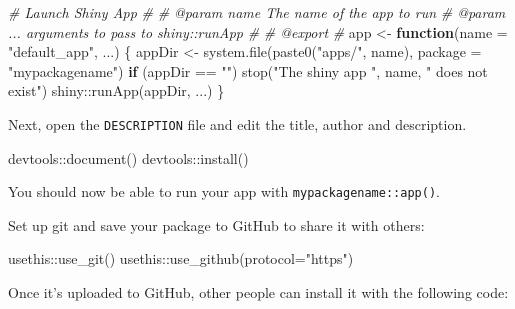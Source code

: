 \documentclass[
]{book}
\newenvironment{Shaded}{\begin{snugshade}}{\end{snugshade}}
\newcommand{\AttributeTok}[1]{\textcolor[rgb]{0.77,0.63,0.00}{#1}}
\newcommand{\CommentTok}[1]{\textcolor[rgb]{0.56,0.35,0.01}{\textit{#1}}}
\newcommand{\ControlFlowTok}[1]{\textcolor[rgb]{0.13,0.29,0.53}{\textbf{#1}}}
\newcommand{\FunctionTok}[1]{\textcolor[rgb]{0.00,0.00,0.00}{#1}}
\newcommand{\NormalTok}[1]{#1}
\newcommand{\OtherTok}[1]{\textcolor[rgb]{0.56,0.35,0.01}{#1}}
\newcommand{\SpecialCharTok}[1]{\textcolor[rgb]{0.00,0.00,0.00}{#1}}
\newcommand{\StringTok}[1]{\textcolor[rgb]{0.31,0.60,0.02}{#1}}
\begin{document}
\begin{Shaded}
\begin{Highlighting}[]
\CommentTok{\#\textquotesingle{} Launch Shiny App}
\CommentTok{\#\textquotesingle{}}
\CommentTok{\#\textquotesingle{} @param name The name of the app to run}
\CommentTok{\#\textquotesingle{} @param ... arguments to pass to shiny::runApp}
\CommentTok{\#\textquotesingle{}}
\CommentTok{\#\textquotesingle{} @export}
\CommentTok{\#\textquotesingle{}}
\NormalTok{app }\OtherTok{\textless{}{-}} \ControlFlowTok{function}\NormalTok{(}\AttributeTok{name =} \StringTok{"default\_app"}\NormalTok{, ...) \{}
\NormalTok{  appDir }\OtherTok{\textless{}{-}} \FunctionTok{system.file}\NormalTok{(}\FunctionTok{paste0}\NormalTok{(}\StringTok{"apps/"}\NormalTok{, name), }\AttributeTok{package =} \StringTok{"mypackagename"}\NormalTok{)}
  \ControlFlowTok{if}\NormalTok{ (appDir }\SpecialCharTok{==} \StringTok{""}\NormalTok{) }\FunctionTok{stop}\NormalTok{(}\StringTok{"The shiny app "}\NormalTok{, name, }\StringTok{" does not exist"}\NormalTok{)}
\NormalTok{  shiny}\SpecialCharTok{::}\FunctionTok{runApp}\NormalTok{(appDir, ...)}
\NormalTok{\}}
\end{Highlighting}
\end{Shaded}

Next, open the \texttt{DESCRIPTION} file and edit the title, author and description.

\begin{Shaded}
\begin{Highlighting}[]
\NormalTok{devtools}\SpecialCharTok{::}\FunctionTok{document}\NormalTok{()}
\NormalTok{devtools}\SpecialCharTok{::}\FunctionTok{install}\NormalTok{()}
\end{Highlighting}
\end{Shaded}

You should now be able to run your app with \texttt{mypackagename::app()}.

Set up git and save your package to GitHub to share it with others:

\begin{Shaded}
\begin{Highlighting}[]
\NormalTok{usethis}\SpecialCharTok{::}\FunctionTok{use\_git}\NormalTok{()}
\NormalTok{usethis}\SpecialCharTok{::}\FunctionTok{use\_github}\NormalTok{(}\AttributeTok{protocol=}\StringTok{"https"}\NormalTok{)}
\end{Highlighting}
\end{Shaded}

Once it's uploaded to GitHub, other people can install it with the following code:
\end{document}
